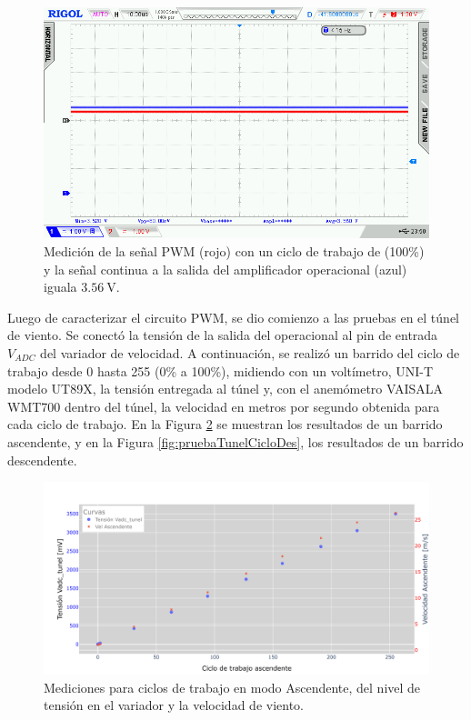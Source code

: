 \begin{figure}[H]
    \centering
    \includegraphics[width=0.9\linewidth]{Figuras/datalogger/Hardware/MedicionesPWM/255.png}
    \caption{Medición de la señal PWM (rojo) con un ciclo de trabajo de (100\%) y la señal continua a la salida del amplificador operacional (azul) iguala $\SI{3.56}{\volt}$.}
    \label{fig:255}
\end{figure}
Luego de caracterizar el circuito PWM, se dio comienzo a las pruebas en el túnel de viento. Se conectó la tensión de la salida del operacional al pin de entrada $V_{ADC}$ del variador de velocidad. A continuación, se realizó un barrido del ciclo de trabajo desde 0 hasta 255 (0\% a 100\%), midiendo con un voltímetro, UNI-T modelo UT89X, la tensión entregada al túnel y, con el anemómetro VAISALA WMT700 dentro del túnel, la velocidad en metros por segundo obtenida para cada ciclo de trabajo. En la Figura \ref{fig:pruebaTunelCicloAsc} se muestran los resultados de un barrido ascendente, y en la Figura \ref{fig:pruebaTunelCicloDes}, los resultados de un barrido descendente.

\begin{figure}[H]
    \centering
    \includegraphics[width=1\linewidth]{Figuras/datalogger/Hardware/MedicionesPWM/pruebaTunelCicloAsc.png}
    \caption{Mediciones para ciclos de trabajo en modo Ascendente, del nivel de tensión en el variador y la velocidad de viento.}
    \label{fig:pruebaTunelCicloAsc}
\end{figure}

